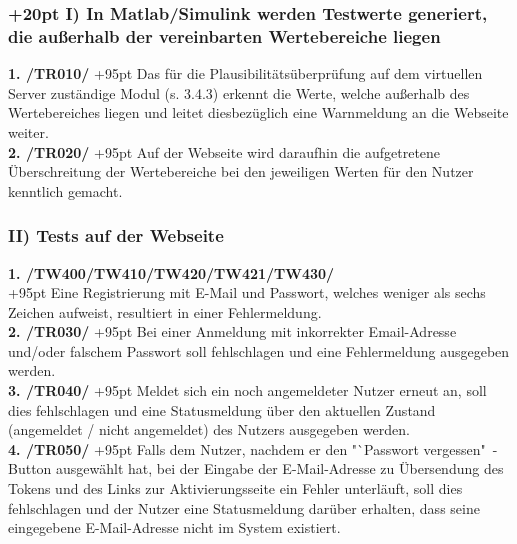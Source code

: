 \documentclass[fontsize = 12pt, paper = a4]{scrreprt}
\begin{document}
\subsubsection*{
\hangindent+20pt 
I) In Matlab/Simulink werden Testwerte generiert, die außerhalb der vereinbarten Wertebereiche liegen \\} 

\vspace*{3mm}

\textbf{1. /TR010/}
\hangindent+95pt 
\hspace*{8mm}
Das für die Plausibilitätsüberprüfung auf dem virtuellen Server zuständige Modul (s. 3.4.3) erkennt die Werte, welche außerhalb des Wertebereiches liegen und leitet diesbezüglich eine Warnmeldung an die Webseite weiter. \\

\textbf{2. /TR020/}
\hangindent+95pt 
\hspace*{5.8mm}
Auf der Webseite wird daraufhin die aufgetretene Überschreitung der Wertebereiche bei den jeweiligen Werten für den Nutzer kenntlich gemacht.



\subsubsection*{II) Tests auf der Webseite}

\vspace*{3mm}

\textbf{1. /TW400/TW410/TW420/TW421/TW430/}\\
\hangindent+95pt 
Eine Registrierung mit E-Mail und Passwort, welches weniger als sechs Zeichen aufweist, resultiert in einer Fehlermeldung.\\

\textbf{2. /TR030/}
\hangindent+95pt 
\hspace*{8mm}
Bei einer Anmeldung mit inkorrekter Email-Adresse und/oder falschem Passwort soll fehlschlagen und eine Fehlermeldung ausgegeben werden. \\

\textbf{3. /TR040/}
\hangindent+95pt 
\hspace*{6.5mm}
Meldet sich ein noch angemeldeter Nutzer erneut an, soll dies fehlschlagen und eine Statusmeldung über den aktuellen Zustand (angemeldet / nicht angemeldet) des Nutzers ausgegeben werden. \\

\textbf{4. /TR050/}
\hangindent+95pt 
\hspace*{5.5mm}
Falls dem Nutzer, nachdem er den "`Passwort vergessen"\ - Button ausgewählt hat, bei der Eingabe der E-Mail-Adresse zu Übersendung des Tokens und des Links zur Aktivierungsseite ein Fehler unterläuft, soll dies fehlschlagen und der Nutzer eine Statusmeldung darüber erhalten, dass seine eingegebene E-Mail-Adresse nicht im System existiert.  
\end{document}
